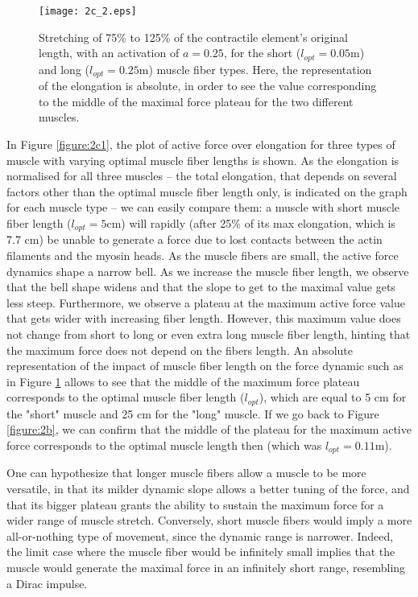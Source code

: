 \documentclass{cmc}
\begin{document}
\begin{figure}[H]
\centering
\texttt{[image: 2c\_2.eps]}
\caption{Stretching of 75\% to 125\% of the contractile element's original length, with an activation of $a=0.25$, for the short ($l_{opt}=0.05$m) and long ($l_{opt}=0.25$m) muscle fiber types. Here, the representation of the elongation is absolute, in order to see the value corresponding to the middle of the maximal force plateau for the two different muscles.}
\label{figure:2c2}
\end{figure}

In Figure \ref{figure:2c1}, the plot of active force over elongation for three types of muscle with varying optimal muscle fiber lengths is shown. As the elongation is normalised for all three muscles -- the total elongation, that depends on several factors other than the optimal muscle fiber length only, is indicated on the graph for each muscle type -- we can easily compare them: a muscle with short muscle fiber length ($l_{opt}=5$cm) will rapidly (after 25\% of its max elongation, which is 7.7 cm) be unable to generate a force due to lost contacts between the actin filaments and the myosin heads. As the muscle fibers are small, the active force dynamics shape a narrow bell. As we increase the muscle fiber length, we observe that the bell shape widens and that the slope to get to the maximal value gets less steep. Furthermore, we observe a plateau at the maximum active force value that gets wider with increasing fiber length. However, this maximum value does not change from short to long or even extra long muscle fiber length, hinting that the maximum force does not depend on the fibers length. An absolute representation of the impact of muscle fiber length on the force dynamic such as in Figure \ref{figure:2c2} allows to see that the middle of the maximum force plateau corresponds to the optimal muscle fiber length ($l_{opt}$), which are equal to 5 cm for the "short" muscle and 25 cm for the "long" muscle. If we go back to Figure \ref{figure:2b}, we can confirm that the middle of the plateau for the maximum active force corresponds to the optimal muscle length then (which was $l_{opt}=0.11$m).

One can hypothesize that longer muscle fibers allow a muscle to be more versatile, in that its milder dynamic slope allows a better tuning of the force, and that its bigger plateau grants the ability to sustain the maximum force for a wider range of muscle stretch. Conversely, short muscle fibers would imply a more all-or-nothing type of movement, since the dynamic range is narrower. Indeed, the limit case where the muscle fiber would be infinitely small implies that the muscle would generate the maximal force in an infinitely short range, resembling a Dirac impulse. 
\end{document}
